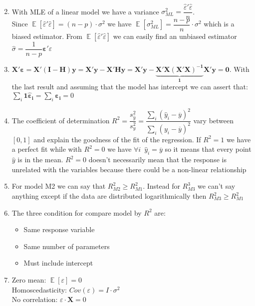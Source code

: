 \documentclass[10pt,a4paper]{article}
\DeclareMathOperator{\E}{\mathbb{E}}
\begin{document}
\begin{enumerate}
\begin{align*}
		\end{align*}
		\item With MLE of a linear model we have a variance $ \sigma^2_{ML} = \dfrac{\hat{\varepsilon}'\hat{\varepsilon}}{n} $.\\
		Since $ \E\left[ \hat{\varepsilon}'\hat{\varepsilon} \right] = (n-p) \cdot \sigma^2$ we have $ \E\left[ \sigma^2_{ML} \right] = \dfrac{n-p}{n} \cdot \sigma^2 $ which is a biased estimator. From $ \E\left[ \hat{\varepsilon}'\hat{\varepsilon} \right]  $ we can easily find an unbiased estimator $ \hat{\sigma} = \dfrac{1}{n-p} \mathbf{\varepsilon}' \varepsilon $
		\item $ \mathbf{X'\varepsilon} = \mathbf{X'(I-H)y}  = \mathbf{X'y - X'Hy} =
		 \mathbf{X'y - \underbrace{\mathbf{X}' \mathbf{X}(\mathbf{X}'\mathbf{X})^{-1}}_1\mathbf{X}' y}  = \mathbf{0} $. With the last result and assuming that the model has intercept we can assert that:
		 $ \sum_i \mathbf{1 \hat{\varepsilon}_i} =   \sum_i \mathbf{\varepsilon_i} = 0 $
		\item The coefficient of determination $ R^2 = \dfrac{s^2_{\hat{y}}}{s^2_y} = \dfrac{\sum_i (\hat{y}_i - \overline{y})^2}{\sum_i (y_i - \overline{y})^2} $ vary between $ \left[0,1\right] $ and explain the goodness of the fit of the regression. If $ R^2=1 $ we have a perfect fit while with $ R^2 = 0 $ we have $ \forall i \,\,\, \hat{y}_i = \overline{y}  $ so it means that every point $ \hat{y} $ is in the mean. $ R^2 = 0 $ doesn't necessarily mean that the response is unrelated with the variables because there could be a non-linear relationship
		\item For model M2 we can say that $ R^2_{M2} \geq R^2_{M1} $. Instead for $ R^3_{M3}  $ we can't say anything except if the data are distributed logarithmically then $ R^2_{M3} \geq R^2_{M1} $
		\item The three condition for compare model by $ R^2 $ are:
		\begin{itemize}
			\item Same response variable
			\item Same number of parameters
			\item Must include intercept
		\end{itemize}
		\item 
		Zero mean:  $ \E\left[\varepsilon \right] = 0 $\\
		Homoscedasticity: $ Cov\left( \varepsilon \right) = I \cdot \sigma^2 $\\
		No correlation: $ \varepsilon \cdot \mathbf{X} = 0 $ \\

\end{enumerate}
\end{document}
